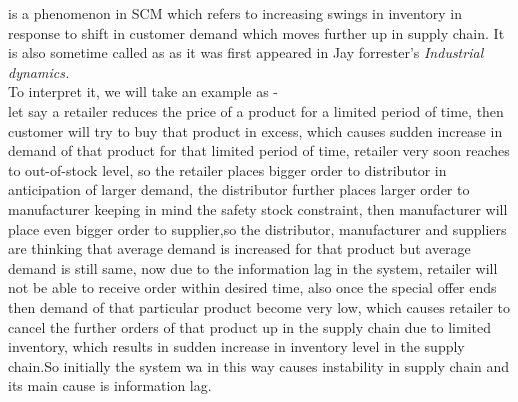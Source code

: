 \documentclass[12pt, a4paper]{report}
\begin{document}
 is a phenomenon in SCM which refers to increasing swings in inventory in response to shift in customer demand which moves further up in supply chain. It is also sometime called as  as it was first appeared in Jay forrester's {\itshape{Industrial dynamics}.}\\
To interpret it, we will take an example as -\\
 let say a retailer reduces the price of a product for a limited period of time, then customer will try to buy that product in excess, which causes sudden increase in demand of that product for that limited period of time, retailer very soon reaches to out-of-stock level, so the retailer places bigger order to distributor in anticipation of larger demand, the distributor further places larger order to manufacturer keeping in mind the safety stock constraint, then manufacturer will place even bigger order to supplier,so the distributor, manufacturer and suppliers are thinking that average demand is increased for that product but average demand is still same, now due to the information lag in the system, retailer will not be able to receive order within desired time, also once the special offer ends then demand of that particular product become very low, which causes retailer to cancel the further orders of that product up in the supply chain due to limited inventory, which results in sudden increase in inventory level in the supply chain.So initially the system wa in this way  causes instability in supply chain and its main cause is information lag.
\end{document}
